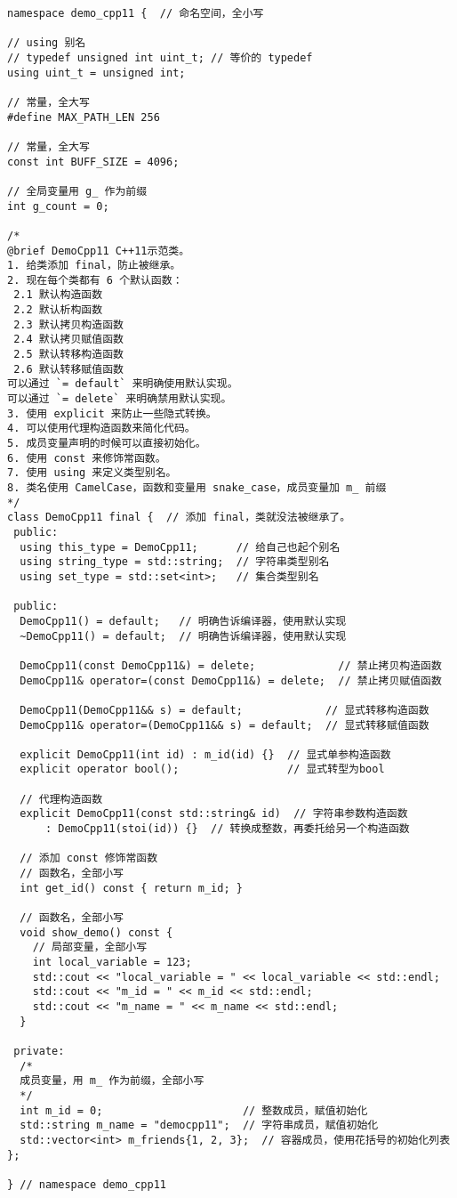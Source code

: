 \begin{verbatim}
namespace demo_cpp11 {  // 命名空间，全小写

// using 别名
// typedef unsigned int uint_t; // 等价的 typedef
using uint_t = unsigned int;

// 常量，全大写
#define MAX_PATH_LEN 256

// 常量，全大写
const int BUFF_SIZE = 4096;

// 全局变量用 g_ 作为前缀
int g_count = 0;

/*
@brief DemoCpp11 C++11示范类。
1. 给类添加 final，防止被继承。
2. 现在每个类都有 6 个默认函数：
 2.1 默认构造函数
 2.2 默认析构函数
 2.3 默认拷贝构造函数
 2.4 默认拷贝赋值函数
 2.5 默认转移构造函数
 2.6 默认转移赋值函数
可以通过 `= default` 来明确使用默认实现。
可以通过 `= delete` 来明确禁用默认实现。
3. 使用 explicit 来防止一些隐式转换。
4. 可以使用代理构造函数来简化代码。
5. 成员变量声明的时候可以直接初始化。
6. 使用 const 来修饰常函数。
7. 使用 using 来定义类型别名。
8. 类名使用 CamelCase，函数和变量用 snake_case，成员变量加 m_ 前缀
*/
class DemoCpp11 final {  // 添加 final，类就没法被继承了。
 public:
  using this_type = DemoCpp11;      // 给自己也起个别名
  using string_type = std::string;  // 字符串类型别名
  using set_type = std::set<int>;   // 集合类型别名

 public:
  DemoCpp11() = default;   // 明确告诉编译器，使用默认实现
  ~DemoCpp11() = default;  // 明确告诉编译器，使用默认实现

  DemoCpp11(const DemoCpp11&) = delete;             // 禁止拷贝构造函数
  DemoCpp11& operator=(const DemoCpp11&) = delete;  // 禁止拷贝赋值函数

  DemoCpp11(DemoCpp11&& s) = default;             // 显式转移构造函数
  DemoCpp11& operator=(DemoCpp11&& s) = default;  // 显式转移赋值函数

  explicit DemoCpp11(int id) : m_id(id) {}  // 显式单参构造函数
  explicit operator bool();                 // 显式转型为bool

  // 代理构造函数
  explicit DemoCpp11(const std::string& id)  // 字符串参数构造函数
      : DemoCpp11(stoi(id)) {}  // 转换成整数，再委托给另一个构造函数

  // 添加 const 修饰常函数
  // 函数名，全部小写
  int get_id() const { return m_id; }

  // 函数名，全部小写
  void show_demo() const {
    // 局部变量，全部小写
    int local_variable = 123;
    std::cout << "local_variable = " << local_variable << std::endl;
    std::cout << "m_id = " << m_id << std::endl;
    std::cout << "m_name = " << m_name << std::endl;
  }

 private:
  /*
  成员变量，用 m_ 作为前缀，全部小写
  */
  int m_id = 0;                      // 整数成员，赋值初始化
  std::string m_name = "democpp11";  // 字符串成员，赋值初始化
  std::vector<int> m_friends{1, 2, 3};  // 容器成员，使用花括号的初始化列表
};

} // namespace demo_cpp11
\end{verbatim}

